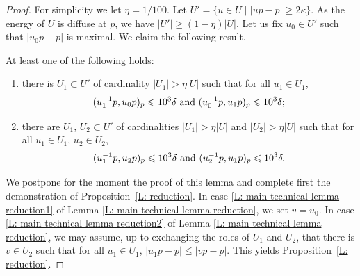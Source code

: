 \begin{proof}
For simplicity we let $\eta = 1/100$.
Let $U'=\{u\in U\mid |up-p|\geqslant 2\kappa\}$.
As the energy of $U$ is diffuse at $p$, we have $|U'|\geq (1-\eta) |U|$.
Let us fix $u_0\in U'$ such that $|u_0p-p|$ is maximal.
We claim the following result.

\begin{lem}\label{L: main technical lemma reduction}
At least one of the following holds:
\begin{enumerate}
\item\label{L: main technical lemma reduction1} there is $U_1\subset U'$ of cardinality $|U_1|>\eta |U|$ such that for all $u_1\in U_1$,
\[
(u_1^{-1}p,u_0p)_p\leqslant 10^3 \delta \hbox{ and } (u_0^{-1}p,u_1p)_p\leqslant 10^3 \delta;
\]
\item\label{L: main technical lemma reduction2} there are $U_1$, $U_2 \subset U'$ of cardinalities $|U_1|>\eta |U|$ and $|U_2|>\eta |U|$ such that for all $u_1\in U_1$, $u_2\in U_2$,
\[
(u_1^{-1}p,u_2p)_p\leqslant 10^3 \delta \hbox{ and } (u_2^{-1}p,u_1p)_p\leqslant 10^3 \delta.
\]
\end{enumerate}

\end{lem}

We postpone for the moment the proof of this lemma and complete first the demonstration of Proposition~\ref{L: reduction}.
In case \eqref{L: main technical lemma reduction1} of Lemma \ref{L: main technical lemma reduction}, we set $v=u_0$. In case \eqref{L: main technical lemma reduction2} of Lemma \ref{L: main technical lemma reduction}, we may assume, up to exchanging the roles of $U_1$ and $U_2$, that there is $v\in U_2$ such that for all $u_1\in U_1$, $|u_1p-p|\leqslant |vp-p|$. This yields Proposition~\ref{L: reduction}.
\end{proof}

